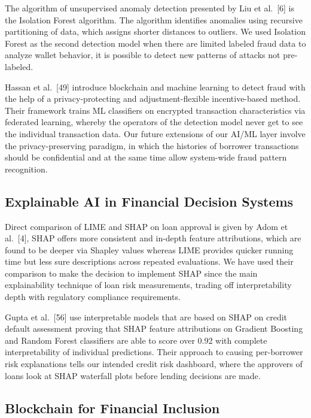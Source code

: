 \documentclass[12pt,a4paper]{report}
\begin{document}
The algorithm of unsupervised anomaly detection presented by Liu et al.~[6] is the Isolation Forest algorithm. The algorithm identifies anomalies using recursive partitioning of data, which assigns shorter distances to outliers. We used Isolation Forest as the second detection model when there are limited labeled fraud data to analyze wallet behavior, it is possible to detect new patterns of attacks not pre-labeled.

Hassan et al.~[49] introduce blockchain and machine learning to detect fraud with the help of a privacy-protecting and adjustment-flexible incentive-based method. Their framework trains ML classifiers on encrypted transaction characteristics via federated learning, whereby the operators of the detection model never get to see the individual transaction data. Our future extensions of our AI/ML layer involve the privacy-preserving paradigm, in which the histories of borrower transactions should be confidential and at the same time allow system-wide fraud pattern recognition.

\subsection{Explainable AI in Financial Decision Systems}

Direct comparison of LIME and SHAP on loan approval is given by Adom et al.~[4], SHAP offers more consistent and in-depth feature attributions, which are found to be deeper via Shapley values whereas LIME provides quicker running time but less sure descriptions across repeated evaluations. We have used their comparison to make the decision to implement SHAP since the main explainability technique of loan risk measurements, trading off interpretability depth with regulatory compliance requirements.

Gupta et al.~[56] use interpretable models that are based on SHAP on credit default assessment proving that SHAP feature attributions on Gradient Boosting and Random Forest classifiers are able to score over 0.92 with complete interpretability of individual predictions. Their approach to causing per-borrower risk explanations tells our intended credit risk dashboard, where the approvers of loans look at SHAP waterfall plots before lending decisions are made.

\subsection{Blockchain for Financial Inclusion}
\end{document}
